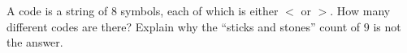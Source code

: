 A code is a string of $8$ symbols, each of which is either $<$ or $>$. How many different codes are there? Explain why the ``sticks and stones'' count of $9$ is not the answer.
